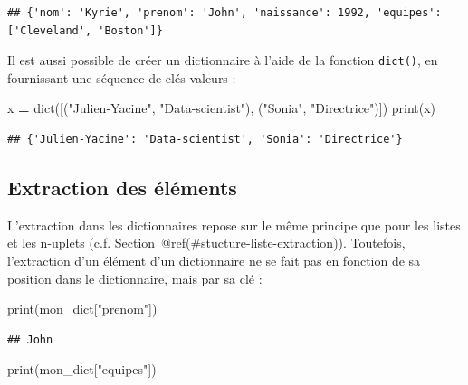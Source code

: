 \documentclass[12pt,]{book}
\newenvironment{Shaded}{\begin{snugshade}}{\end{snugshade}}
\newcommand{\StringTok}[1]{\textcolor[rgb]{0.31,0.60,0.02}{#1}}
\newcommand{\OperatorTok}[1]{\textcolor[rgb]{0.81,0.36,0.00}{\textbf{#1}}}
\newcommand{\BuiltInTok}[1]{#1}
\newcommand{\NormalTok}[1]{#1}
\numberwithin{equation}{section}
\numberwithin{countremarque}{section}
\begin{document}
\begin{lstlisting}
## {'nom': 'Kyrie', 'prenom': 'John', 'naissance': 1992, 'equipes': ['Cleveland', 'Boston']}
\end{lstlisting}

Il est aussi possible de créer un dictionnaire à l'aide de la fonction
\texttt{dict()}, en fournissant une séquence de clés-valeurs :

\begin{Shaded}
\begin{Highlighting}[]
\NormalTok{x }\OperatorTok{=} \BuiltInTok{dict}\NormalTok{([(}\StringTok{"Julien-Yacine"}\NormalTok{, }\StringTok{"Data-scientist"}\NormalTok{),}
\NormalTok{  (}\StringTok{"Sonia"}\NormalTok{, }\StringTok{"Directrice"}\NormalTok{)])}
\BuiltInTok{print}\NormalTok{(x)}
\end{Highlighting}
\end{Shaded}

\begin{lstlisting}
## {'Julien-Yacine': 'Data-scientist', 'Sonia': 'Directrice'}
\end{lstlisting}

\subsection{Extraction des éléments}\label{extraction-des-elements-1}

L'extraction dans les dictionnaires repose sur le même principe que pour
les listes et les n-uplets (c.f.
Section~@ref(\#stucture-liste-extraction)). Toutefois, l'extraction d'un
élément d'un dictionnaire ne se fait pas en fonction de sa position dans
le dictionnaire, mais par sa clé :

\begin{Shaded}
\begin{Highlighting}[]
\BuiltInTok{print}\NormalTok{(mon_dict[}\StringTok{"prenom"}\NormalTok{])}
\end{Highlighting}
\end{Shaded}

\begin{lstlisting}
## John
\end{lstlisting}

\begin{Shaded}
\begin{Highlighting}[]
\BuiltInTok{print}\NormalTok{(mon_dict[}\StringTok{"equipes"}\NormalTok{])}
\end{Highlighting}
\end{Shaded}
\end{document}
